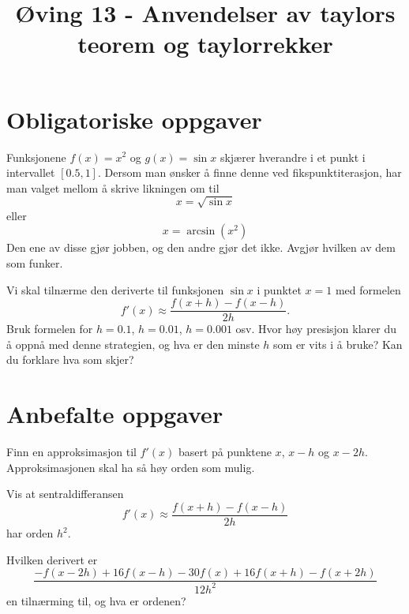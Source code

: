 \documentclass[a4paper,norsk,11pt]{interaktiv}
\title{Øving 13 - Anvendelser av taylors teorem og taylorrekker}
\begin{document}

\maketitle


\section*{Obligatoriske oppgaver}


\begin{oppgave}{1}
Funksjonene
$
f(x)=x^2
$
og 
$
g(x)=\sin x
$
skjærer hverandre i et punkt i intervallet $[0.5,1]$. 
Dersom man ønsker å finne denne ved fikspunktiterasjon, 
har man valget mellom å skrive likningen om til 
\[
x=\sqrt{\sin x}
\]
eller 
\[
x=\arcsin\left(x^2\right)
\]
Den ene av disse gjør jobben, og den andre gjør det ikke. 
Avgjør hvilken av dem som funker.
\end{oppgave}

\begin{oppgave}{2}
Vi skal tilnærme den deriverte til funksjonen $\sin x$ i punktet $x=1$ med formelen 
\begin{equation*}
f'(x) \approx \frac{f(x+h)-f(x-h)}{2h}.
\end{equation*} 
Bruk formelen for $h=0.1$,  $h=0.01$,  $h=0.001$ osv. 
Hvor høy presisjon klarer du å oppnå med denne strategien, 
og hva er den minste $h$ som er vits i å bruke? 
Kan du forklare hva som skjer?
\end{oppgave}




\section*{Anbefalte oppgaver}

\begin{oppgave}{1}
Finn en approksimasjon til $f'(x)$ basert på punktene $x$, $x-h$ og $x-2h$. 
Approksimasjonen skal ha så høy orden som mulig.
\end{oppgave}

\begin{oppgave}{2}
Vis at sentraldifferansen 
\begin{equation*}
f'(x) \approx \frac{f(x+h)-f(x-h)}{2h}
\end{equation*} 
har orden $h^2$.
\end{oppgave}

\begin{oppgave}{3}
Hvilken derivert er 
\begin{equation*}
\frac{-f(x-2h)+16f(x-h)-30f(x)+16f(x+h)-f(x+2h)}{12h^2}
\end{equation*}
en tilnærming til, og hva er ordenen?
\end{oppgave}
\end{document}
